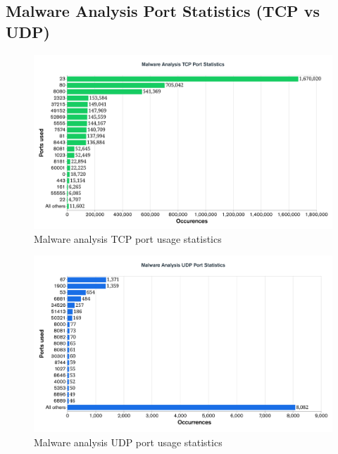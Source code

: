 \begin{appendices}
\newpage

\section{Malware Analysis Port Statistics (TCP vs UDP)}
\label{appendix_a7}
\begin{figure}[!htb]
    \centering
    \includegraphics[width=1.0\linewidth]{results/tcp_port_statistics.png}
    \caption{Malware analysis TCP port usage statistics}
    \label{fig:tcp_port_stats} 
\end{figure}

\begin{figure}[!htb]
    \centering
    \includegraphics[width=1.0\linewidth]{results/udp_port_statistics.png}
    \caption{Malware analysis UDP port usage statistics}
    \label{fig:udp_port_stats} 
\end{figure}

\newpage


\end{appendices}
